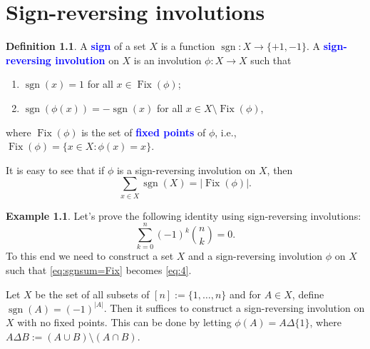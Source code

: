 \documentclass[oneside]{book}
\numberwithin{equation}{section}
\theoremstyle{definition}
\newtheorem{exam}[thm]{Example}
\newtheorem{defn}[thm]{Definition}
\newcommand\Fix{\operatorname{Fix}}
\newcommand\sgn{\operatorname{sgn}}
\renewcommand\emph[1]{\textcolor{blue}{\bf #1}}
\begin{document}
\appendix

\chapter{Sign-reversing involutions}
\label{sec:sign-revers-invol}

\begin{defn}
  A \emph{sign} of a set \( X \) is a function
  \( \sgn:X \to \{+1,-1\} \). A \emph{sign-reversing involution} on
  \( X \) is an involution \( \phi:X\to X \) such that
  \begin{enumerate}
  \item \( \sgn(x)=1 \) for all \( x\in \Fix(\phi) \);
  \item \( \sgn(\phi(x)) = -\sgn(x) \) for all
  \( x\in X \setminus \Fix(\phi) \),
  \end{enumerate}
  where \( \Fix(\phi) \) is the set of \emph{fixed points} of
  \( \phi \), i.e., \( \Fix(\phi) = \{x\in X: \phi(x) = x \} \).
\end{defn}

It is easy to see that if \( \phi \) is a sign-reversing involution on
\( X \), then
\begin{equation}\label{eq:sgnsum=Fix}
  \sum_{x\in X} \sgn(X) = |\Fix(\phi)|.
\end{equation}

\begin{exam}
  Let's prove the following identity using sign-reversing involutions:
  \begin{equation}\label{eq:4}
    \sum_{k=0}^{n} (-1)^{k} \binom{n}{k} = 0.
  \end{equation}
  To this end we need to construct a set \( X \) and a sign-reversing
  involution \( \phi \) on \( X \) such that \eqref{eq:sgnsum=Fix}
  becomes \eqref{eq:4}.

  Let \( X \) be the set of all subsets of \( [n]:= \{ 1,\dots,n \} \)
  and for \( A\in X \), define \( \sgn(A) = (-1)^{|A|} \). Then it
  suffices to construct a sign-reversing involution on \( X \) with no
  fixed points. This can be done by letting
  \( \phi(A) = A \Delta \{1\} \), where
  \( A \Delta B := (A \cup B) \setminus (A \cap B) \).
\end{exam}
\end{document}
